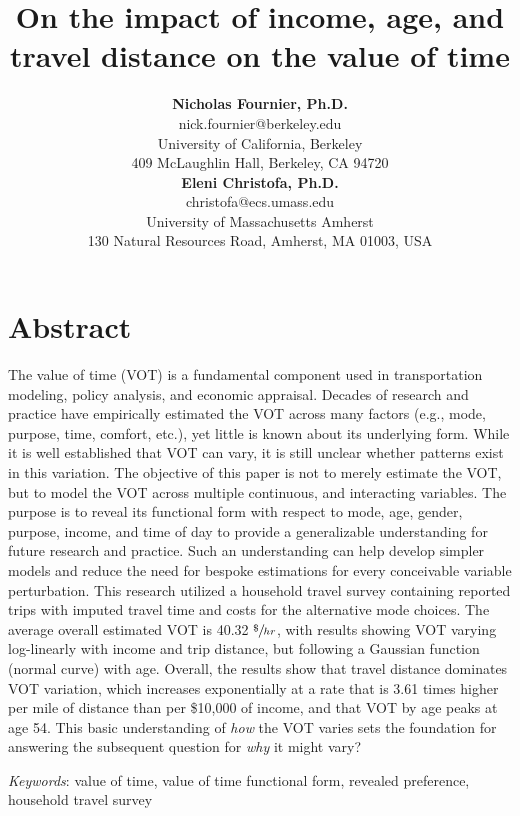 \documentclass[numbered]{trbunofficial}\usepackage[]{graphicx}\usepackage[]{color}
\title{On the impact of income, age, and travel distance on the value of time}
\author{%
  \textbf{Nicholas Fournier, Ph.D.}\\
  nick.fournier@berkeley.edu\\
  University of California, Berkeley\\
  409 McLaughlin Hall, Berkeley, CA 94720\\
  \hfill\break%
  \textbf{Eleni Christofa, Ph.D.}\\
  christofa@ecs.umass.edu\\
  University of Massachusetts Amherst\\
  130 Natural Resources Road, Amherst, MA 01003, USA
}
\begin{document}



\maketitle

\section{Abstract}
The value of time (VOT) is a fundamental component used in transportation modeling, policy analysis, and economic appraisal. Decades of research and practice have empirically estimated the VOT across many factors (e.g., mode, purpose, time, comfort, etc.), yet little is known about its underlying form. While it is well established that VOT can vary, it is still unclear whether patterns exist in this variation. The objective of this paper is not to merely estimate the VOT, but to model the VOT across multiple continuous, and interacting variables. The purpose is to reveal its functional form with respect to mode, age, gender, purpose, income, and time of day to provide a generalizable understanding for future research and practice. Such an understanding can help develop simpler models and reduce the need for bespoke estimations for every conceivable variable perturbation. This research utilized a household travel survey containing  reported trips with imputed travel time and costs for the alternative mode choices. The average overall estimated VOT is 40.32 $\sfrac{\$}{hr}$, with results showing VOT varying log-linearly with income and trip distance, but following a Gaussian function (normal curve) with age. Overall, the results show that travel distance dominates VOT variation, which increases exponentially at a rate that is 3.61 times higher per mile of distance than per \$10,000 of income, and that VOT by age peaks at age 54. This basic understanding of \emph{how} the VOT varies sets the foundation for answering the subsequent question for \emph{why} it might vary? 

\hfill\break%
\noindent\textit{Keywords}: value of time, value of time functional form, revealed preference, household travel survey
\newpage
\end{document}
